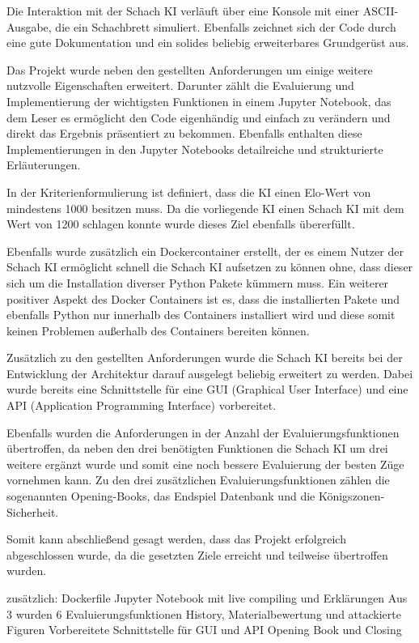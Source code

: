 Die Interaktion mit der Schach KI verläuft über eine Konsole mit einer ASCII-Ausgabe, die ein Schachbrett simuliert. Ebenfalls zeichnet sich der Code durch eine gute Dokumentation und ein solides beliebig erweiterbares Grundgerüst aus.

Das Projekt wurde neben den gestellten Anforderungen um einige weitere nutzvolle Eigenschaften erweitert. Darunter zählt die Evaluierung und Implementierung der wichtigsten Funktionen in einem Jupyter Notebook, das dem Leser es ermöglicht den Code eigenhändig und einfach zu verändern und direkt das Ergebnis präsentiert zu bekommen. Ebenfalls enthalten diese Implementierungen in den Jupyter Notebooks detailreiche und strukturierte Erläuterungen.

In der Kriterienformulierung ist definiert, dass die KI einen Elo-Wert von mindestens 1000 besitzen muss. Da die vorliegende KI einen Schach KI mit dem Wert von 1200 schlagen konnte wurde dieses Ziel ebenfalls übererfüllt.

Ebenfalls wurde zusätzlich ein Dockercontainer erstellt, der es einem Nutzer der Schach KI ermöglicht schnell die Schach KI aufsetzen zu können ohne, dass dieser sich um die Installation diverser Python Pakete kümmern muss. Ein weiterer positiver Aspekt des Docker Containers ist es, dass die installierten Pakete und ebenfalls Python nur innerhalb des Containers installiert wird und diese somit keinen Problemen außerhalb des Containers bereiten können.

Zusätzlich zu den gestellten Anforderungen wurde die Schach KI bereits bei der Entwicklung der Architektur darauf ausgelegt beliebig erweitert zu werden. Dabei wurde bereits eine Schnittstelle für eine \acs{GUI} (Graphical User Interface) und eine \acs{API} (Application Programming Interface) vorbereitet.

Ebenfalls wurden die Anforderungen in der Anzahl der Evaluierungsfunktionen übertroffen, da neben den drei benötigten Funktionen die Schach KI um drei weitere ergänzt wurde und somit eine noch bessere Evaluierung der besten Züge vornehmen kann. Zu den drei zusätzlichen Evaluierungsfunktionen zählen die sogenannten Opening-Books, das Endspiel Datenbank und die Königszonen-Sicherheit.

Somit kann abschließend gesagt werden, dass das Projekt erfolgreich abgeschlossen wurde, da die gesetzten Ziele erreicht und teilweise übertroffen wurden.

\iffalse


zusätzlich:
Dockerfile
Jupyter Notebook mit live compiling und Erklärungen
Aus 3 wurden 6 Evaluierungsfunktionen
History, Materialbewertung und attackierte Figuren
Vorbereitete Schnittstelle für GUI und API
Opening Book und Closing

